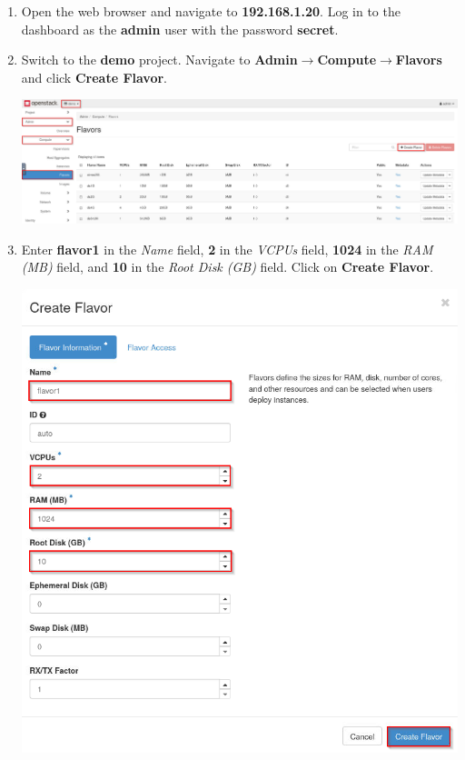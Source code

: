 \documentclass[letterpaper, 12pt]{article}
\begin{document}
\begin{enumerate}
    \item Open the web browser and navigate to \textbf{192.168.1.20}. Log in to the dashboard as the \textbf{admin} user
    with the password \textbf{secret}.
    
    \item Switch to the \textbf{demo} project. Navigate to \textbf{Admin$\rightarrow$Compute$\rightarrow$Flavors} and
    click \textbf{Create Flavor}.

    \begin{center}
        \includegraphics[width=\linewidth]{images/part2/step2.png}
    \end{center}

    \item Enter \textbf{flavor1} in the \textit{Name} field, \textbf{2} in the \textit{VCPUs} field, \textbf{1024} in
    the \textit{RAM (MB)} field, and \textbf{10} in the \textit{Root Disk (GB)} field. Click on \textbf{Create Flavor}.

    \begin{center}
        \includegraphics[width=\linewidth]{images/part2/step3.png}
    \end{center}


\end{enumerate}
\end{document}
